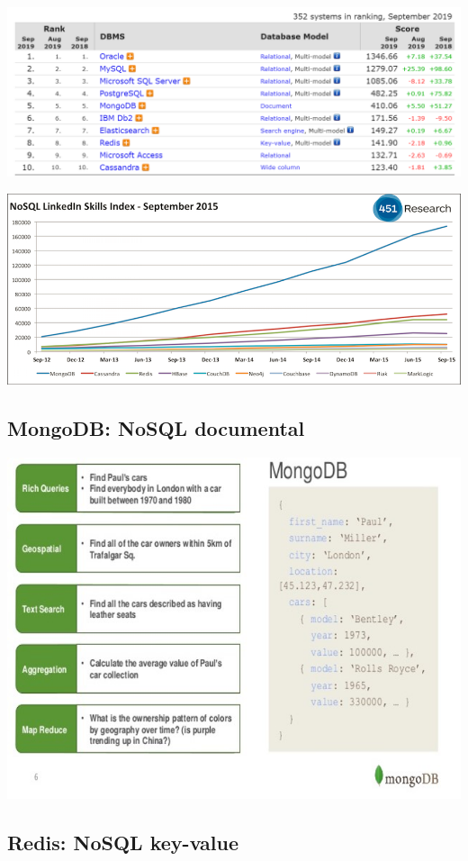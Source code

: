 \documentclass[
]{book}
\begin{document}
\includegraphics{images/DBEnginesRanking.png}

\includegraphics{images/451ResearchSkills.png}

\hypertarget{mongodb-nosql-documental}{%
\subsection{MongoDB: NoSQL documental}\label{mongodb-nosql-documental}}

\includegraphics{images/MongoDB.jpg}

\hypertarget{redis-nosql-key-value}{%
\subsection{Redis: NoSQL key-value}\label{redis-nosql-key-value}}
\end{document}
